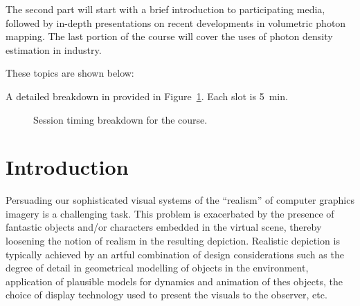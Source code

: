 \documentclass[11pt,fleqn]{book} %
\begin{document}
The second part will start with a brief introduction to participating media, followed by in-depth presentations on recent developments in volumetric photon mapping. The last portion of the course will cover the uses of photon density estimation in industry.

These topics are shown below:

A detailed breakdown in provided in Figure~\ref{fig:half-day}. Each slot is 5~min.

\begin{figure}[b!]
\begin{center}
\end{center}
\caption{%
\label{fig:half-day}%
Session timing breakdown for the course.
}
\end{figure}





\pagestyle{empty} %

{}
\tableofcontents %

\cleardoublepage %

\pagestyle{fancy} %



\chapter{Introduction}
Persuading our sophisticated visual systems of the ``realism'' of computer graphics imagery is a challenging task. 
This problem is exacerbated by the presence of fantastic objects and/or characters embedded in the virtual scene, thereby loosening the notion of realism in the resulting depiction. 
Realistic depiction is typically achieved by an artful combination of design considerations such as the degree of detail in geometrical modelling of objects in the environment, application of plausible models for dynamics and animation of thes objects, the choice of display technology used to present the visuals to the observer, etc. 
\end{document}
